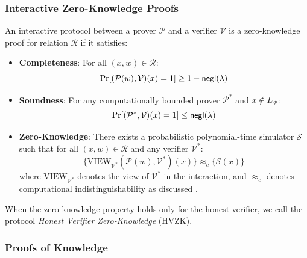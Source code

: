 \subsubsection{Interactive Zero-Knowledge Proofs}

\begin{definition}
\label{def:zkproof}
An interactive protocol between a prover $\mathcal{P}$ and a verifier $\mathcal{V}$ is a zero-knowledge proof for relation $\mathcal{R}$ if it satisfies:

\begin{itemize}
    \item \textbf{Completeness}: For all $(x,w) \in \mathcal{R}$:
    $$\Pr[(\mathcal{P}(w), \mathcal{V})(x) = 1] \geq 1 - \mathsf{negl}(\lambda)$$
    
    \item \textbf{Soundness}: For any computationally bounded prover $\mathcal{P}^*$ and $x \notin L_\mathcal{R}$:
    $$\Pr[(\mathcal{P}^*, \mathcal{V})(x) = 1] \leq \mathsf{negl}(\lambda)$$
    
    \item \textbf{Zero-Knowledge}: There exists a probabilistic polynomial-time simulator $\mathcal{S}$ such that for all $(x,w) \in \mathcal{R}$ and any verifier $\mathcal{V}^*$:
    $$\{\text{VIEW}_{\mathcal{V}^*}(\mathcal{P}(w), \mathcal{V}^*)(x)\} \approx_c \{\mathcal{S}(x)\}$$
    where $\text{VIEW}_{\mathcal{V}^*}$ denotes the view of $\mathcal{V}^*$ in the interaction, and $\approx_c$ denotes computational indistinguishability as discussed \cite{goldwasser_probabilistic_1982}.
\end{itemize}
\end{definition}

\begin{remark}
When the zero-knowledge property holds only for the honest verifier, we call the protocol \emph{Honest Verifier Zero-Knowledge} (HVZK).
\end{remark}

\subsubsection{Proofs of Knowledge}

